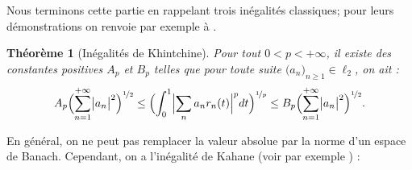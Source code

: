 \documentclass{smfart}
\theoremstyle{plain}
\newtheorem{theorem}{Théorème}[section]
\theoremstyle{definition}
\newcommand{\demi}{{\nicefrac{1}{2}}}
\begin{document}
\bigskip


Nous terminons cette partie en rappelant trois inégalités classiques;
pour leurs démonstrations on renvoie par exemple à \cite[Théorème 1.10, 1.14 et
11.1]{DJT}.

\begin{theorem}[Inégalités de Khintchine]\label{thm:hinchin}
  Pour tout $0 < p < +\infty$, il existe des constantes positives
  $A_p$ et $B_p$ telles que pour toute suite $\bigl(a_n\bigr)_{n\ge
    1}\in\ell_2$, on ait :
\[
A_p\Bigl(\sum \limits_ {n=1}^{+\infty} \bigl|a_n\bigr|^2\Bigr)^\demi
\leq
\Bigl(\int_0^1 \Bigl|\sum _n  a_n r_n(t) \Bigr|^p dt \Bigr)^{\nicefrac{1}{p}}
\leq
B_p\Bigl(\sum \limits_ {n=1}^{+\infty} \bigl|a_n\bigr|^2\Bigr)^\demi.
\]  
\end{theorem}
 
\noindent En général, on ne peut pas remplacer la valeur absolue par la norme
d'un espace de Banach. Cependant, on a l'inégalité de Kahane (voir par
exemple \cite[Théorème 11.1]{DJT}) :
\end{document}
